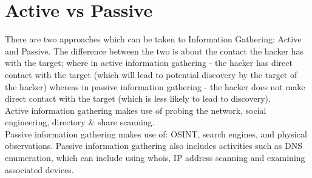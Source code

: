 
\section{Active vs Passive}
There are two approaches which can be taken to Information Gathering: Active and Passive. The difference between the two is about the contact the hacker has with the target; where in active information gathering - the hacker has direct contact with the target (which will lead to potential discovery by the target of the hacker) whereas in passive information gathering - the hacker does not make direct contact with the target (which is less likely to lead to discovery).\\

Active information gathering makes use of probing the network, social engineering, directory \& share scanning. \\

Passive information gathering makes use of: OSINT, search engines, and physical observations. Passive information gathering also includes activities such as DNS enumeration, which can include using whois, IP address scanning and examining associated devices.